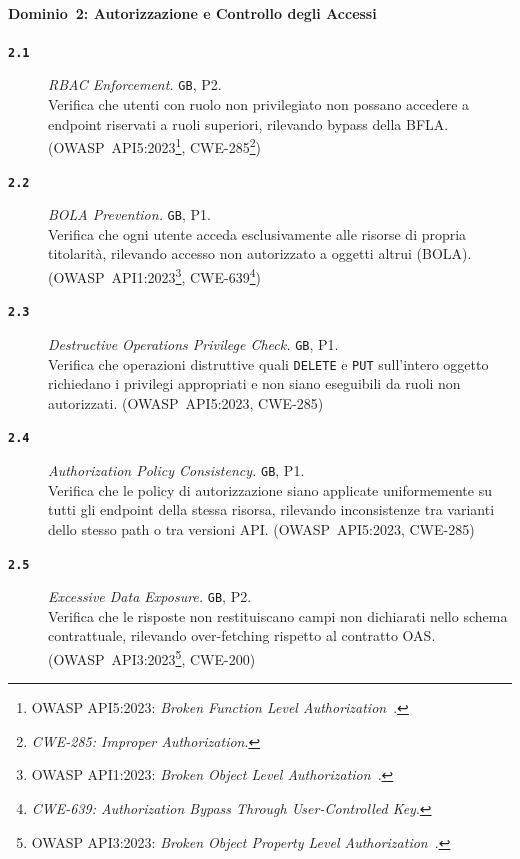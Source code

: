 \paragraph{Dominio~2: Autorizzazione e Controllo degli Accessi}
\begin{description}
      \item[\textbf{\texttt{2.1}}]
            \textit{\gls{RBAC} Enforcement.} \texttt{GB}, P2.\\
            Verifica che utenti con ruolo non privilegiato non possano accedere a endpoint riservati a ruoli superiori, rilevando bypass della \gls{BFLA}.
            (\gls{OWASP}~API5:2023\footnote{\gls{OWASP} API5:2023: \textit{Broken Function Level Authorization}~\cite{OWASPTop10}.}, \gls{CWE}-285\footnote{\textit{CWE-285: Improper Authorization}.})

      \item[\textbf{\texttt{2.2}}]
            \textit{\gls{BOLA} Prevention.} \texttt{GB}, P1.\\
            Verifica che ogni utente acceda esclusivamente alle risorse di propria titolarità, rilevando accesso non autorizzato a oggetti altrui (\gls{BOLA}).
            (\gls{OWASP}~API1:2023\footnote{\gls{OWASP} API1:2023: \textit{Broken Object Level Authorization}~\cite{OWASPTop10}.}, \gls{CWE}-639\footnote{\textit{CWE-639: Authorization Bypass Through User-Controlled Key}.})

      \item[\textbf{\texttt{2.3}}]
            \textit{Destructive Operations Privilege Check.} \texttt{GB}, P1.\\
            Verifica che operazioni distruttive quali \texttt{DELETE} e \texttt{PUT} sull'intero oggetto richiedano i privilegi appropriati e non siano eseguibili da ruoli non autorizzati.
            (\gls{OWASP}~API5:2023, \gls{CWE}-285)

      \item[\textbf{\texttt{2.4}}]
            \textit{Authorization Policy Consistency.} \texttt{GB}, P1.\\
            Verifica che le policy di autorizzazione siano applicate uniformemente su tutti gli endpoint della stessa risorsa, rilevando inconsistenze tra varianti dello stesso path o tra versioni \gls{API}.
            (\gls{OWASP}~API5:2023, \gls{CWE}-285)

      \item[\textbf{\texttt{2.5}}]
            \textit{Excessive Data Exposure.} \texttt{GB}, P2.\\
            Verifica che le risposte non restituiscano campi non dichiarati nello schema contrattuale, rilevando over-fetching rispetto al contratto \gls{OAS}.
            (\gls{OWASP}~API3:2023\footnote{\gls{OWASP} API3:2023: \textit{Broken Object Property Level Authorization}~\cite{OWASPTop10}.}, \gls{CWE}-200)
\end{description}

